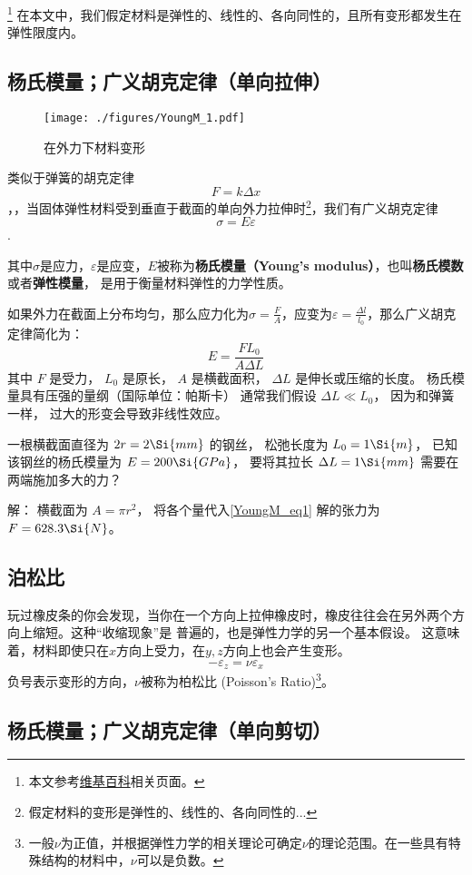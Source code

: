
\begin{issues}
\issueDraft
\end{issues}

\footnote{本文参考\href{https://en.wikipedia.org/wiki/Young's_modulus}{维基百科}相关页面。}
在本文中，我们假定材料是弹性的、线性的、各向同性的，且所有变形都发生在弹性限度内。

\subsection{杨氏模量；广义胡克定律（单向拉伸）}
\begin{figure}[ht]
\centering
\texttt{[image: ./figures/YoungM\_1.pdf]}
\caption{在外力下材料变形} \label{YoungM_fig1}
\end{figure}

类似于弹簧的胡克定律$$F=k \Delta x$$，，当固体弹性材料受到垂直于截面的单向外力拉伸时\footnote{假定材料的变形是弹性的、线性的、各向同性的...}，我们有广义胡克定律$$\sigma = E \varepsilon$$.

其中$\sigma$是应力，$\varepsilon$是应变，$E$被称为\textbf{杨氏模量（Young's modulus）}，也叫\textbf{杨氏模数}或者\textbf{弹性模量}， 是用于衡量材料弹性的力学性质。

如果外力在截面上分布均匀，那么应力化为$\sigma=\frac{F}{A}$，应变为$\varepsilon=\frac{\Delta l}{l_0}$，那么广义胡克定律简化为：
\begin{equation}\label{YoungM_eq1}
E = \frac{FL_0}{A\Delta L}
\end{equation}
其中 $F$ 是受力， $L_0$ 是原长， $A$ 是横截面积， $\Delta L$ 是伸长或压缩的长度。 杨氏模量具有压强的量纲（国际单位：帕斯卡）   通常我们假设 $\Delta L \ll L_0$， 因为和弹簧一样， 过大的形变会导致非线性效应。

\begin{example}{}
一根横截面直径为 $2r = 2\Si{mm}$ 的钢丝， 松弛长度为 $L_0 = 1\Si{m}$， 已知该钢丝的杨氏模量为 $E = 200\Si{GPa}$， 要将其拉长 $\Delta L = 1\Si{mm}$ 需要在两端施加多大的力？

解： 横截面为 $A = \pi r^2$， 将各个量代入\autoref{YoungM_eq1} 解的张力为 $F = 628.3\Si{N}$。
\end{example}

\subsection{泊松比}
玩过橡皮条的你会发现，当你在一个方向上拉伸橡皮时，橡皮往往会在另外两个方向上缩短。这种“收缩现象”是
普遍的，也是弹性力学的另一个基本假设。%
这意味着，材料即使只在$x$方向上受力，在$y,z$方向上也会产生变形。
$$-\varepsilon_z= \nu \varepsilon_x$$
负号表示变形的方向，$\nu$被称为柏松比 (Poisson's Ratio)\footnote{一般$\nu$为正值，并根据弹性力学的相关理论可确定$\nu$的理论范围。在一些具有特殊结构的材料中，$\nu$可以是负数。}。%

\subsection{杨氏模量；广义胡克定律（单向剪切）}

